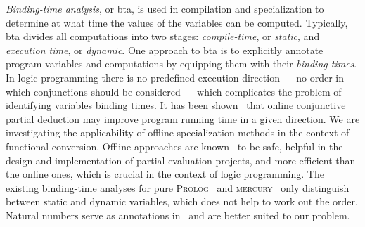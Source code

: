 \documentclass[submission,copyright,creativecommons]{eptcs}
\newcommand{\prolog}{\textsc{Prolog}}
\newcommand{\mercury}{\textsc{mercury}}
\begin{document}
\emph{Binding-time analysis}, or bta, is used in compilation and specialization to determine at what time the values of the variables can be computed.
Typically, bta divides all computations into two stages: \emph{compile-time}, or \emph{static}, and \emph{execution time}, or \emph{dynamic}.
One approach to bta is to explicitly annotate program variables and computations by equipping them with their \emph{binding times}.
In logic programming there is no predefined execution direction --- no order in which conjunctions should be considered ---
which complicates the problem of identifying variables binding times.
It has been shown~\cite{lozov2019relational} that online conjunctive partial deduction may improve program running time in a given direction.
We are investigating the applicability of offline specialization methods in the context of functional conversion.
Offline approaches are known~\cite{jones1993partial} to be safe, helpful in the design and implementation of partial evaluation projects, and more efficient than the online ones, which is crucial in the context of logic programming.
The existing binding-time analyses for pure \prolog{}~\cite{craig2004fully} and \mercury{}~\cite{vanhoof2004binding} only distinguish between static and dynamic variables, which does not help to work out the order.
Natural numbers serve as annotations in~\cite{Thiemann1997AUF} and are better suited to our problem.


\end{document}
